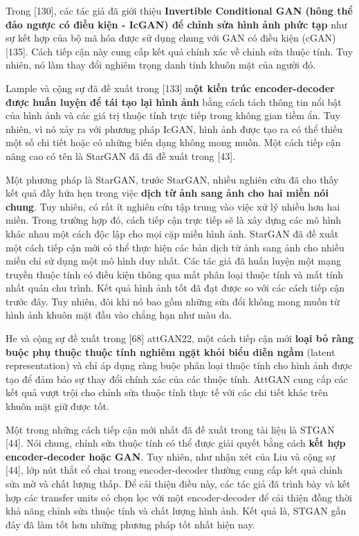 \documentclass{article}
\begin{document}
Trong [130], các tác giả đã giới thiệu \textbf{Invertible Conditional GAN (hông thể đảo ngược có điều kiện - IcGAN) để chỉnh sửa hình ảnh phức tạp} như sự kết hợp của bộ mã hóa được sử dụng chung với GAN có điều kiện (cGAN) [135]. Cách tiếp cận này cung cấp kết quả chính xác về chỉnh sửa thuộc tính. Tuy nhiên, nó làm thay đổi nghiêm trọng danh tính khuôn mặt của người đó.

Lample và cộng sự đã đề xuất trong [133] m\textbf{ột kiến trúc encoder-decoder được huấn luyện để tái tạo lại hình ảnh} bằng cách tách thông tin nổi bật của hình ảnh và các giá trị thuộc tính trực tiếp trong không gian tiềm ẩn. Tuy nhiên, vì nó xảy ra với phương pháp IcGAN, hình ảnh được tạo ra có thể thiếu một số chi tiết hoặc có những biến dạng không mong muốn. Một cách tiếp cận nâng cao có tên là StarGAN đã đã đề xuất trong [43].

Một phương pháp là StarGAN, trước StarGAN, nhiều nghiên cứu đã cho thấy kết quả đầy hứa hẹn trong việc \textbf{dịch từ ảnh sang ảnh cho hai miền nói chung}. Tuy nhiên, có rất ít nghiên cứu tập trung vào việc xử lý nhiều hơn hai miền. Trong trường hợp đó, cách tiếp cận trực tiếp sẽ là xây dựng các mô hình khác nhau một cách độc lập cho mọi cặp miền hình ảnh. StarGAN đã đề xuất một cách tiếp cận mới có thể thực hiện các bản dịch từ ảnh sang ảnh cho nhiều miền chỉ sử dụng một mô hình duy nhất. Các tác giả đã huấn luyện một mạng truyền thuộc tính có điều kiện thông qua mất phân loại thuộc tính và mất tính nhất quán chu trình. Kết quả hình ảnh tốt đã đạt được so với các cách tiếp cận trước đây. Tuy nhiên, đôi khi nó bao gồm những sửa đổi không mong muốn từ hình ảnh khuôn mặt đầu vào chẳng hạn như màu da.

He và cộng sự đề xuất trong [68] attGAN22, một cách tiếp cận mới \textbf{loại bỏ ràng buộc phụ thuộc thuộc tính nghiêm ngặt khỏi biểu diễn ngầm} (latent representation) và chỉ áp dụng ràng buộc phân loại thuộc tính cho hình ảnh được tạo để đảm bảo sự thay đổi chính xác của các thuộc tính. AttGAN cung cấp các kết quả vượt trội cho chỉnh sửa thuộc tính thực tế với các chi tiết khác trên khuôn mặt giữ được tốt.

Một trong những cách tiếp cận mới nhất đã đề xuất trong tài liệu là STGAN [44]. Nói chung, chỉnh sửa thuộc tính có thể được giải quyết bằng cách \textbf{kết hợp encoder-decoder hoặc GAN}. Tuy nhiên, như nhận xét của Liu và cộng sự [44], lớp nút thắt cổ chai trong encoder-decoder thường cung cấp kết quả chỉnh sửa mờ và chất lượng thấp. Để cải thiện điều này, các tác giả đã trình bày và kết hợp các transfer units có chọn lọc với một encoder-decoder để cải thiện đồng thời khả năng chỉnh sửa thuộc tính và chất lượng hình ảnh. Kết quả là, STGAN gần đây đã làm tốt hơn những phương pháp tốt nhất hiện nay.
\end{document}
